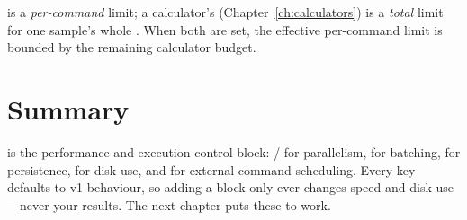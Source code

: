 \begin{jwarn}
 is a \emph{per-command} limit; a calculator's 
(Chapter~\ref{ch:calculators}) is a \emph{total} limit for one sample's whole .
When both are set, the effective per-command limit is bounded by the remaining calculator budget.
\end{jwarn}

\section{Summary}
\label{sec:rt-summary}

 is the performance and execution-control block: /
for parallelism,  for batching,  for persistence,
 for disk use, and  for external-command scheduling.
Every key defaults to v1 behaviour, so adding a  block only ever changes speed and
disk use---never your results. The next chapter puts these to work.
